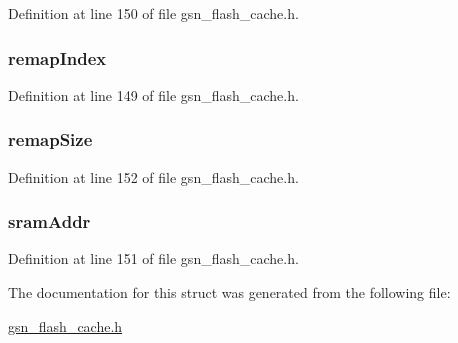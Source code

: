 Definition at line 150 of file gsn\_\-flash\_\-cache.h.

\hypertarget{a00074_a315c43ae7f3a96179716b2564ca9a0f4}{
\subsubsection[{remapIndex}]{ {\bf remapIndex}}}
\label{a00074_a315c43ae7f3a96179716b2564ca9a0f4}


Definition at line 149 of file gsn\_\-flash\_\-cache.h.

\hypertarget{a00074_a9768b2fadf3fc72ea46325f64345ecb7}{
\subsubsection[{remapSize}]{ {\bf remapSize}}}
\label{a00074_a9768b2fadf3fc72ea46325f64345ecb7}


Definition at line 152 of file gsn\_\-flash\_\-cache.h.

\hypertarget{a00074_a6b728d16c94f762108480a6f8f1e211c}{
\subsubsection[{sramAddr}]{ {\bf sramAddr}}}
\label{a00074_a6b728d16c94f762108480a6f8f1e211c}


Definition at line 151 of file gsn\_\-flash\_\-cache.h.



The documentation for this struct was generated from the following file:\begin{DoxyCompactItemize}
\item 
\hyperlink{a00500}{gsn\_\-flash\_\-cache.h}\end{DoxyCompactItemize}
